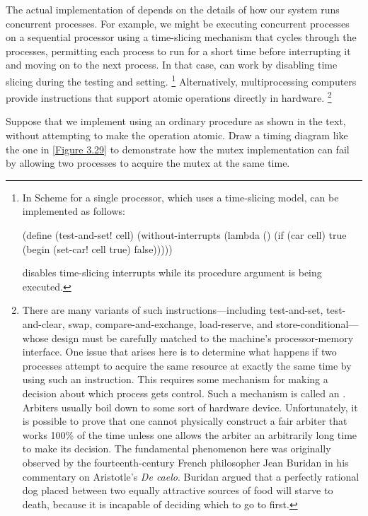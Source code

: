 The actual implementation of  depends on the details of how our system runs concurrent processes.
For example, we might be executing concurrent processes on a sequential processor using a time-slicing mechanism that cycles through the processes, permitting each process to run for a short time before interrupting it and moving on to the next process.
In that case,   can work by disabling time slicing during the testing and setting.%
\footnote{
	In  Scheme for a single processor, which uses a
	time-slicing model,  can be implemented as follows:
	\begin{smallscheme}
	  (define (test-and-set! cell)
	    (without-interrupts
	     (lambda ()
	       (if (car cell)
	           true
	           (begin (set-car! cell true)
	                  false)))))
	\end{smallscheme}
	 disables time-slicing interrupts while its procedure
	argument is being executed.
}
Alternatively, multiprocessing computers provide instructions that support atomic operations directly in hardware.%
\footnote{
	There are many variants of such instructions---including test-and-set, test-and-clear, swap, compare-and-exchange, load-reserve, and store-conditional---whose design must be carefully matched to the machine’s processor-memory interface.
	One issue that arises here is to determine what happens if two processes attempt to acquire the same resource at exactly the same time by using such an instruction.
	This requires some mechanism for making a decision about which process gets control.
	Such a mechanism is called an .
	Arbiters usually boil down to some sort of hardware device.
	Unfortunately, it is possible to prove that one cannot physically construct a fair arbiter that works 100\% of the time unless one allows the arbiter an arbitrarily long time to make its decision.
	The fundamental phenomenon here was originally observed by the fourteenth-century French philosopher Jean Buridan in his commentary on Aristotle’s \textit{De caelo}.
	Buridan argued that a perfectly rational dog placed between two equally attractive sources of food will starve to death, because it is incapable of deciding which to go to first.
}



\begin{exercise}
	\label{Exercise 3.46}
	Suppose that we implement   using an ordinary procedure as shown in the text, without attempting to make the operation atomic.
	Draw a timing diagram like the one in \cref{Figure 3.29} to demonstrate how the mutex implementation can fail by allowing two processes to acquire the mutex at the same time.
\end{exercise}



